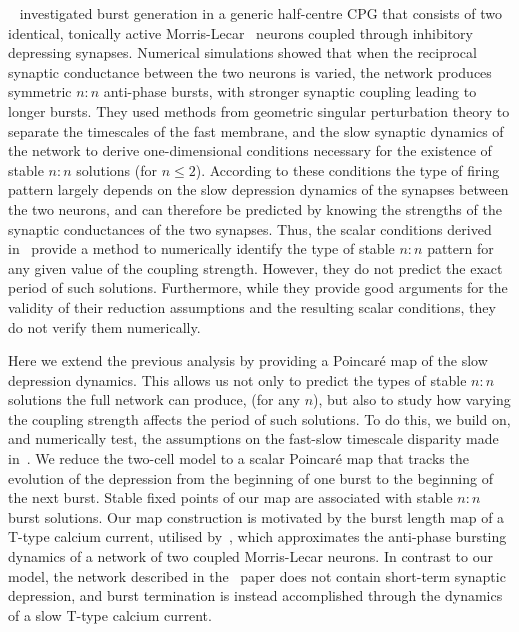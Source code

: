 ~\citet{bose2011} investigated burst generation in a generic half-centre CPG that consists
of two identical, tonically active Morris-Lecar~\citep{morris1981} neurons coupled through
inhibitory depressing synapses.
Numerical simulations showed that when the reciprocal synaptic conductance between the two neurons is varied, the network produces symmetric $n:n$ anti-phase bursts, with stronger synaptic coupling leading to longer bursts.
They used methods from geometric singular perturbation theory to separate the timescales of the fast membrane, and the slow synaptic dynamics of the network to derive one-dimensional conditions necessary for the existence of stable $n:n$ solutions (for $n\leq 2$).
According to these conditions the type of firing pattern largely depends on the slow
depression dynamics of the synapses between the two neurons, and can therefore be
predicted by knowing the strengths of the synaptic conductances of the two synapses.
Thus, the scalar conditions derived in~\citet{bose2011} provide a method to numerically
identify the type of stable $n:n$ pattern for any given value of the coupling strength.
However, they do not predict the exact period of such solutions.
Furthermore, while they provide good arguments for the validity of their reduction assumptions and the resulting scalar conditions, they do not verify them numerically.

Here we extend the previous analysis by providing a Poincaré map of the slow depression
dynamics.
This allows us not only to predict the types of stable $n:n$ solutions the full
network can produce, (for any $n$), but also to study how varying the coupling strength
affects the period of such solutions.
To do this, we build on, and numerically test, the
assumptions on the fast-slow timescale disparity made in~\cite{bose2011}.
We reduce the two-cell model to a scalar Poincaré map that tracks the evolution of the depression from the beginning of one burst to the beginning of the next burst.
Stable fixed points of our map are associated with stable $n:n$ burst solutions.
Our map construction is motivated by the burst length map of a T-type calcium current, utilised by~\citet{matveev2007}, which approximates the anti-phase bursting dynamics of a network of two coupled Morris-Lecar neurons.
In contrast to our model, the network described in the~\cite{matveev2007} paper does not contain short-term synaptic depression, and burst termination is instead accomplished through the dynamics of a slow T-type calcium current.

